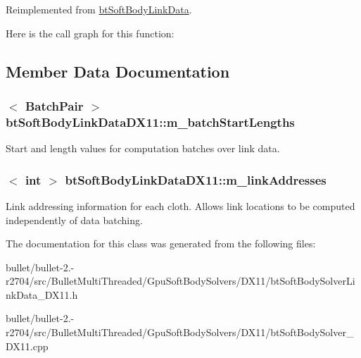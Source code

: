 Reimplemented from \hyperlink{classbt_soft_body_link_data_a44f200dcb878405cebf3704dc7a8b8cd}{bt\+Soft\+Body\+Link\+Data}.



Here is the call graph for this function\+:




\subsection{Member Data Documentation}
\hypertarget{classbt_soft_body_link_data_d_x11_af39feddd5c9c8beb3003fb07df835705}{
\subsubsection[{m\+\_\+batch\+Start\+Lengths}]{$<$ {\bf Batch\+Pair} $>$ bt\+Soft\+Body\+Link\+Data\+D\+X11\+::m\+\_\+batch\+Start\+Lengths}}\label{classbt_soft_body_link_data_d_x11_af39feddd5c9c8beb3003fb07df835705}
Start and length values for computation batches over link data. \hypertarget{classbt_soft_body_link_data_d_x11_a712400cc15cbe3fd96d93cfa135f53ef}{
\subsubsection[{m\+\_\+link\+Addresses}]{$<$ int $>$ bt\+Soft\+Body\+Link\+Data\+D\+X11\+::m\+\_\+link\+Addresses}}\label{classbt_soft_body_link_data_d_x11_a712400cc15cbe3fd96d93cfa135f53ef}
Link addressing information for each cloth. Allows link locations to be computed independently of data batching. 

The documentation for this class was generated from the following files\+:\begin{DoxyCompactItemize}
\item 
bullet/bullet-\/2.-\/r2704/src/\+Bullet\+Multi\+Threaded/\+Gpu\+Soft\+Body\+Solvers/\+D\+X11/bt\+Soft\+Body\+Solver\+Link\+Data\+\_\+\+D\+X11.\+h\item 
bullet/bullet-\/2.-\/r2704/src/\+Bullet\+Multi\+Threaded/\+Gpu\+Soft\+Body\+Solvers/\+D\+X11/bt\+Soft\+Body\+Solver\+\_\+\+D\+X11.\+cpp\end{DoxyCompactItemize}
